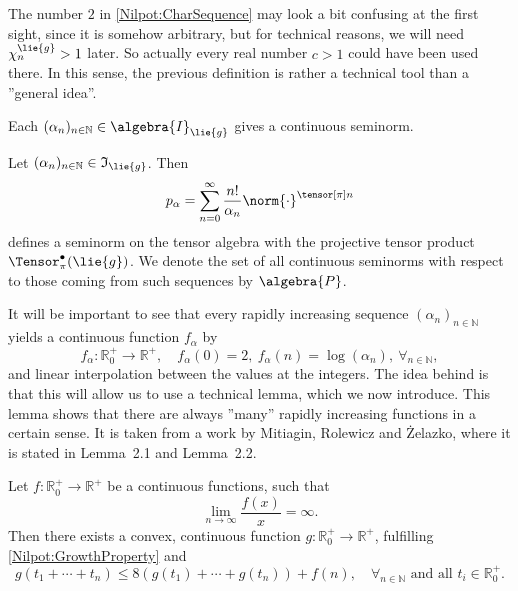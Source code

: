 \begin{remark}
	The number $2$ in \eqref{Nilpot:CharSequence} may look a bit confusing at 
	the first sight, since it is somehow arbitrary, but for technical reasons, 
	we will need $\chi^{\lie{g}}_n > 1$ later. 
	So actually every real number $c > 1$ 
	could have been used there. In this sense, the previous definition is rather 
	a technical tool than a ''general idea''.
\end{remark}
Each $(\alpha_n)_{n \in \mathbb{N}} \in \algebra{I}_{\lie{g}}$ gives a continuous 
seminorm.
\begin{definition}
	Let $(\alpha_n)_{n \in \mathbb{N}} \in \mathfrak{I}_{\lie{g}}$. Then
	\begin{equation*}
		p_{\alpha}
		=
		\sum\limits_{n = 0}^{\infty}
		\frac{n!}{\alpha_n}
		\norm{\cdot}^{\tensor[\pi] n}
	\end{equation*}
	defines a seminorm on the tensor algebra with the projective tensor product 
	$\Tensor_{\pi}^{\bullet}(\lie{g})$. We denote the set of all continuous 
	seminorms with respect to those	coming from such sequences by $\algebra{P}$.
\end{definition}
It will be important to see that every rapidly increasing sequence 
$(\alpha_n)_{n \in \mathbb{N}}$ yields a continuous function $f_{\alpha}$ by
\begin{equation}
	\label{Nilpot:IncreasingFunction}
	f_{\alpha}
	\colon
	\mathbb{R}_0^+
	\longrightarrow
	\mathbb{R}^+
	, \quad
	f_{\alpha}(0)
	=
	2
	,\
	f_{\alpha}(n)
	=
	\log \left( \alpha_n \right)
	,\
	\forall_{n \in \mathbb{N}},
\end{equation}
and linear interpolation between the values at the integers. The idea behind is 
that this will allow us to use a technical lemma, which we now introduce. This 
lemma shows that there are always ''many'' rapidly increasing functions in a 
certain sense. It is taken from a work \cite{mitiagin.rolewicz.zelazko:1962a} by 
Mitiagin, Rolewicz and \.{Z}elazko, where it is stated in Lemma~2.1 and Lemma~2.2.
\begin{lemma}
	\label{Nilpot:Lemma:MRZGrothLemma}
	Let $f\colon \mathbb{R}_0^+ \longrightarrow \mathbb{R}^+$ be a continuous 
	functions, such that
	\begin{equation}
		\label{Nilpot:GrowthProperty}
		\lim_{n \longrightarrow \infty}
		\frac{f(x)}{x}
		=
		\infty.
	\end{equation}
	Then there exists a convex, continuous function $g \colon \mathbb{R}_0^+ 
	\longrightarrow \mathbb{R}^+$, fulfilling \eqref{Nilpot:GrowthProperty} and
	\begin{equation}
		\label{Nilpot:SplittingProperty}
		g \left(
			t_1 + \cdots + t_n
		\right)
		\leq
		8 \left(
			g \left( t_1 \right)
			+ \cdots +
			g \left( t_n \right)
		\right)
		+
		f(n)
		, \quad
		\forall_{n \in \mathbb{N}}
		\text{ and all }
		t_i \in \mathbb{R}_0^+.
	\end{equation}
\end{lemma}
